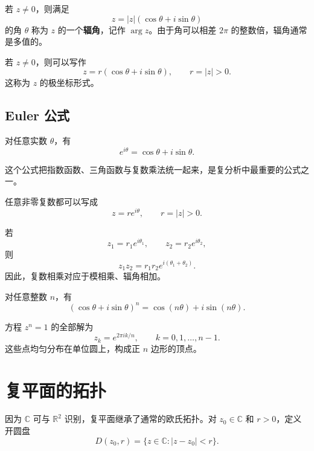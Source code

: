 \begin{definition}[辐角]
若 $z\ne0$，则满足
\[
    z=|z|(\cos\theta+i\sin\theta)
\]
的角 $\theta$ 称为 $z$ 的一个\textbf{辐角}，记作 $\arg z$。由于角可以相差 $2\pi$ 的整数倍，辐角通常是多值的。
\end{definition}

\begin{definition}[极坐标形式]
若 $z\ne0$，则可以写作
\[
    z=r(\cos\theta+i\sin\theta),
    \qquad r=|z|>0.
\]
这称为 $z$ 的极坐标形式。
\end{definition}

\subsection{Euler 公式}

\begin{theorem}[Euler 公式]
对任意实数 $\theta$，有
\[
    e^{i\theta}=\cos\theta+i\sin\theta.
\]
\end{theorem}

这个公式把指数函数、三角函数与复数乘法统一起来，是复分析中最重要的公式之一。

\begin{corollary}[指数形式]
任意非零复数都可以写成
\[
    z=re^{i\theta},
    \qquad r=|z|>0.
\]
\end{corollary}

\begin{proposition}[极坐标形式下的乘法]
若
\[
    z_1=r_1e^{i\theta_1},
    \qquad
    z_2=r_2e^{i\theta_2},
\]
则
\[
    z_1z_2=r_1r_2e^{i(\theta_1+\theta_2)}.
\]
因此，复数相乘对应于模相乘、辐角相加。
\end{proposition}

\begin{theorem}[De Moivre 公式]
对任意整数 $n$，有
\[
    (\cos\theta+i\sin\theta)^n
    =\cos(n\theta)+i\sin(n\theta).
\]
\end{theorem}

\begin{example}[单位根]
方程 $z^n=1$ 的全部解为
\[
    z_k=e^{2\pi i k/n},
    \qquad k=0,1,\dots,n-1.
\]
这些点均匀分布在单位圆上，构成正 $n$ 边形的顶点。
\end{example}

\section{复平面的拓扑}

因为 $\mathbb{C}$ 可与 $\mathbb{R}^2$ 识别，复平面继承了通常的欧氏拓扑。对 $z_0\in\mathbb{C}$ 和 $r>0$，定义开圆盘
\[
    D(z_0,r)=\{z\in\mathbb{C}:|z-z_0|<r\}.
\]

